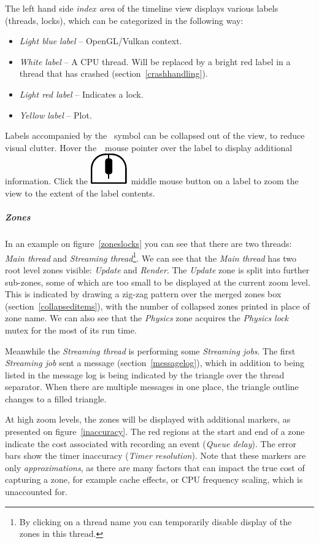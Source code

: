 \documentclass[hidelinks,titlepage,a4paper]{article}
\newcommand{\MMB}{\includegraphics[height=.8\baselineskip]{icons/mmb}}
\begin{document}
The left hand side \emph{index area} of the timeline view displays various labels (threads, locks), which can be categorized in the following way:

\begin{itemize}
\item \emph{Light blue label} -- OpenGL/Vulkan context.
\item \emph{White label} -- A CPU thread. Will be replaced by a bright red label in a thread that has crashed (section~\ref{crashhandling}).
\item \emph{Light red label} -- Indicates a lock.
\item \emph{Yellow label} -- Plot.
\end{itemize}

Labels accompanied by the \faCaretDown{}~symbol can be collapsed out of the view, to reduce visual clutter. Hover the~\faMousePointer{}~mouse pointer over the label to display additional information. Click the \MMB{}~middle mouse button on a label to zoom the view to the extent of the label contents.

\subparagraph{Zones}

In an example on figure~\ref{zoneslocks} you can see that there are two threads: \emph{Main thread} and \emph{Streaming thread}\footnote{By clicking on a thread name you can temporarily disable display of the zones in this thread.}. We can see that the \emph{Main thread} has two root level zones visible: \emph{Update} and \emph{Render}. The \emph{Update} zone is split into further sub-zones, some of which are too small to be displayed at the current zoom level. This is indicated by drawing a zig-zag pattern over the merged zones box (section~\ref{collapseditems}), with the number of collapsed zones printed in place of zone name. We can also see that the \emph{Physics} zone acquires the \emph{Physics lock} mutex for the most of its run time.

Meanwhile the \emph{Streaming thread} is performing some \emph{Streaming jobs}. The first \emph{Streaming job} sent a message (section~\ref{messagelog}), which in addition to being listed in the message log is being indicated by the triangle over the thread separator. When there are multiple messages in one place, the triangle outline changes to a filled triangle.

At high zoom levels, the zones will be displayed with additional markers, as presented on figure~\ref{inaccuracy}. The red regions at the start and end of a zone indicate the cost associated with recording an event (\emph{Queue delay}). The error bars show the timer inaccuracy (\emph{Timer resolution}). Note that these markers are only \emph{approximations}, as there are many factors that can impact the true cost of capturing a zone, for example cache effects, or CPU frequency scaling, which is unaccounted for.
\end{document}

